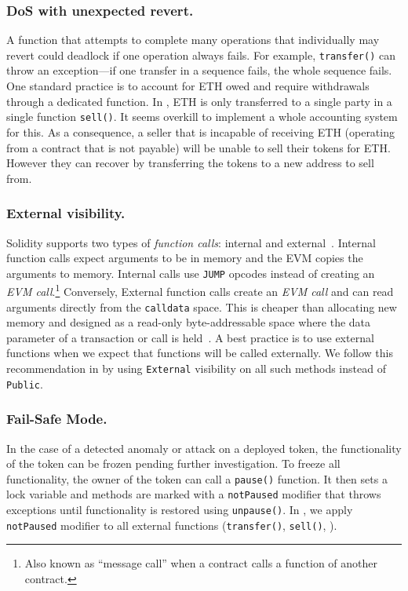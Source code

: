 \subsubsection{DoS with unexpected revert.}

A function that attempts to complete many operations that individually may revert could deadlock if one operation always fails. For example, \texttt{transfer()} can throw an exception---if one transfer in a sequence fails, the whole sequence fails. One standard practice is to account for ETH owed and require withdrawals through a dedicated function. In \sys, ETH is only transferred to a single party in a single function \texttt{sell()}. It seems overkill to implement a whole accounting system for this. As a consequence, a seller that is incapable of receiving ETH (\eg operating from a contract that is not payable) will be unable to sell their tokens for ETH. However they can recover by transferring the tokens to a new address to sell from. 

\subsubsection{External visibility.}

Solidity supports two types of \textit{function calls}: internal and external~\cite{SolidityDoc}. Internal function calls expect arguments to be in memory and the EVM copies the arguments to memory. Internal calls use \texttt{JUMP} opcodes instead of creating an \textit{EVM call}.\footnote{Also known as ``message call'' when a contract calls a function of another contract.} Conversely, External function calls create an \textit{EVM call} and can read arguments directly from the \texttt{calldata} space. This is cheaper than allocating new memory and designed as a read-only byte-addressable space where the data parameter of a transaction or call is held~\cite{EthInDepth}. A best practice is to use external functions when we expect that functions will be called externally. We follow this recommendation in \sys by using \texttt{External} visibility on all such methods instead of \texttt{Public}. 

\subsubsection{Fail-Safe Mode.}

In the case of a detected anomaly or attack on a deployed \erc token, the functionality of the token can be frozen pending further investigation. To freeze all functionality, the owner of the token can call a \texttt{pause()} function. It then sets a lock variable and methods are marked with a \texttt{notPaused} modifier that throws exceptions until functionality is restored using \texttt{unpause()}. In \sys, we apply \texttt{notPaused} modifier to all external functions (\eg \texttt{transfer()}, \texttt{sell()}, \etc).

